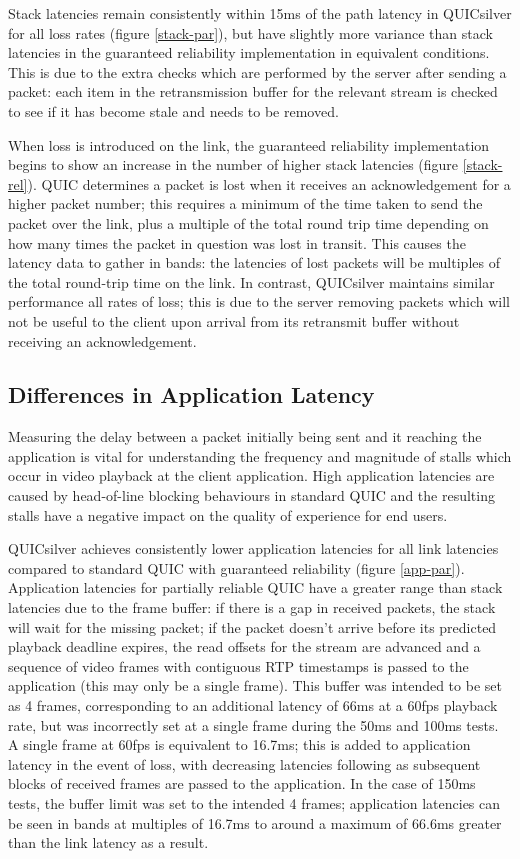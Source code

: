 \documentclass{mpaper}
\begin{document}
Stack latencies remain consistently within 15ms of the path latency in QUICsilver for all loss rates (figure \ref{stack-par}), but have slightly more variance than stack latencies in the guaranteed reliability implementation in equivalent conditions. This is due to the extra checks which are performed by the server after sending a packet: each item in the retransmission buffer for the relevant stream is checked to see if it has become stale and needs to be removed.


When loss is introduced on the link, the guaranteed reliability implementation begins to show an increase in the number of higher stack latencies (figure \ref{stack-rel}). QUIC determines a packet is lost when it receives an acknowledgement for a higher packet number; this requires a minimum of the time taken to send the packet over the link, plus a multiple of the total round trip time depending on how many times the packet in question was lost in transit. This causes the latency data to gather in bands: the latencies of lost packets will be multiples of the total round-trip time on the link. In contrast, QUICsilver maintains similar performance all rates of loss; this is due to the server removing packets which will not be useful to the client upon arrival from its retransmit buffer without receiving an acknowledgement.

\subsection{Differences in Application Latency}

Measuring the delay between a packet initially being sent and it reaching the application is vital for understanding the frequency and magnitude of stalls which occur in video playback at the client application. High application latencies are caused by head-of-line blocking behaviours in standard QUIC and the resulting stalls have a negative impact on the quality of experience for end users.

QUICsilver achieves consistently lower application latencies for all link latencies compared to standard QUIC with guaranteed reliability (figure \ref{app-par}). Application latencies for partially reliable QUIC have a greater range than stack latencies due to the frame buffer: if there is a gap in received packets, the stack will wait for the missing packet; if the packet doesn't arrive before its predicted playback deadline expires, the read offsets for the stream are advanced and a sequence of video frames with contiguous RTP timestamps is passed to the application (this may only be a single frame). This buffer was intended to be set as 4 frames, corresponding to an additional latency of 66ms at a 60fps playback rate, but was incorrectly set at a single frame during the 50ms and 100ms tests. A single frame at 60fps is equivalent to 16.7ms; this is added to application latency in the event of loss, with decreasing latencies following as subsequent blocks of received frames are passed to the application. In the case of 150ms tests, the buffer limit was set to the intended 4 frames; application latencies can be seen in bands at multiples of 16.7ms to around a maximum of 66.6ms greater than the link latency as a result.
\end{document}

